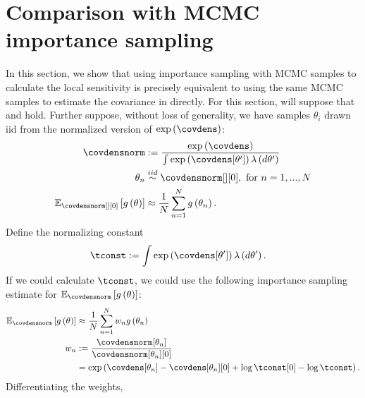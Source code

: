 \documentclass{article}\usepackage[]{graphicx}\usepackage[]{color}
\theoremstyle{plain}
\theoremstyle{definition}
\theoremstyle{plain}
\theoremstyle{plain}
\theoremstyle{plain}
\theoremstyle{plain}
\begin{document}
\section{Comparison with MCMC importance sampling\label{app:mcmc_importance_sampling}}

In this section, we show that using importance sampling with MCMC
samples to calculate the local sensitivity 
is precisely equivalent to using the same MCMC samples to estimate
the covariance in  directly.
For this section, will suppose that 
and  hold. Further suppose, without loss
of generality, we have samples $\theta_{i}$ drawn iid from the normalized
version of $\exp\left(\covdens\right)$:
\begin{align*}
\covdensnorm & :=\frac{\exp\left(\covdens\right)}{\int\exp\left(\covdens[\theta']\right)\lambda\left(d\theta'\right)}\\
\theta_{n} & \iid\covdensnorm[][0],\textrm{ for }n=1,...,N\\
\mbe_{\covdensnorm[][0]}\left[g\left(\theta\right)\right] & \approx\frac{1}{N}\sum_{n=1}^{N}g\left(\theta_{n}\right).
\end{align*}
Define the normalizing constant
\begin{align*}
\tconst & :=\int\exp\left(\covdens[\theta']\right)\lambda\left(d\theta'\right).
\end{align*}
If we could calculate $\tconst$, we could use the following importance
sampling estimate for $\mbe_{\covdensnorm}\left[g\left(\theta\right)\right]$:
\begin{align*}
\mbe_{\covdensnorm}\left[g\left(\theta\right)\right] & \approx\frac{1}{N}\sum_{n=1}^{N}w_{n}g\left(\theta_{n}\right)\\
w_{n} & :=\frac{\covdensnorm[\theta_{n}]}{\covdensnorm[\theta_{n}][0]}\\
 & =\exp\left(\covdens[\theta_{n}]-\covdens[\theta_{n}][0]+\log\tconst[0]-\log\tconst\right).
\end{align*}
Differentiating the weights,
\end{document}
